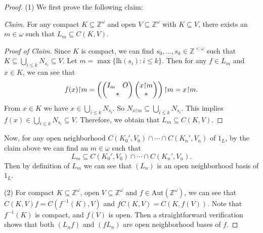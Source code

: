\documentclass[11pt]{amsart}
\theoremstyle{definition}
\theoremstyle{remark}
\numberwithin{equation}{section}
\def\Z {{\mathbb{Z}}}
\def\lh{{\mathrm{lh}}}
\renewcommand{\restriction}{\mathord{\upharpoonright}}
\def\aut{{\mathrm{Aut}}}
\begin{document}
\begin{proof}
    (1) We first prove the following claim:

{\sl Claim.} For any compact $K\subseteq\Z^\omega$ and open $V\subseteq\Z^\omega$ with $K\subseteq V$, there exists an $m\in\omega$ such that $L_m\subseteq C(K,V)$.

   \begin{proof}[Proof of Claim]
        Since $K$ is compact, we can find $s_0,\dots,s_k\in\Z^{<\omega}$ such that $K\subseteq \bigcup_{i\leq k}N_{s_i}\subseteq V$. Let $m=\max\{\lh(s_i):i\leq k\}$. Then for any $f\in L_m$ and $x\in K$, we can see that
        \begin{align*}
            f(x)\restriction m=\left(\begin{pmatrix}
                I_m & O\\
                \multicolumn{2}{c}{*}
            \end{pmatrix}\begin{pmatrix}
                x\restriction m\\
                *
            \end{pmatrix}\right)\restriction m=x\restriction m.
        \end{align*}
        From $x\in K$ we have $x\in\bigcup_{i\leq k}N_{s_i}$. So $N_{x\restriction m}\subseteq\bigcup_{i\leq k}N_{s_i}$. This implies $f(x)\in\bigcup_{i\leq k}N_{s_i}\subseteq V$. Therefore, we obtain that $L_m\subseteq C(K,V)$.
    \end{proof}

    Now, for any open neighborhood $C(K_0',V_0)\cap\cdots\cap C(K_n',V_n)$ of $1_L$, by the claim above we can find an $m\in\omega$ such that
    $$L_m\subseteq C(K_0',V_0)\cap\cdots\cap C(K_n',V_n).$$
    Then by definition of $L_m$ we can see that $(L_n)$ is an open neighborhood basis of $1_L$.

    (2) For compact $K\subseteq\Z^\omega$, open $V\subseteq\Z^\omega$ and $f\in\aut(\Z^\omega)$, we can see that $C(K,V)f=C(f^{-1}(K),V)$ and $fC(K,V)=C(K,f(V))$. Note that $f^{-1}(K)$ is compact, and $f(V)$ is open. Then a straightforward verification shows that both $(L_nf)$ and $(fL_n)$ are open neighborhood bases of $f$.


\end{proof}
\end{document}
